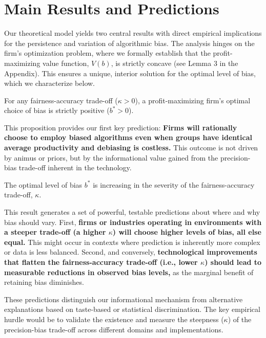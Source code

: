 \section{Main Results and Predictions}

Our theoretical model yields two central results with direct empirical implications for the persistence and variation of algorithmic bias. The analysis hinges on the firm's optimization problem, where we formally establish that the profit-maximizing value function, $V(b)$, is strictly concave (see Lemma 3 in the Appendix). This ensures a unique, interior solution for the optimal level of bias, which we characterize below.

\begin{proposition}
\label{prop:existence}
For any fairness-accuracy trade-off ($\kappa > 0$), a profit-maximizing firm's optimal choice of bias is strictly positive ($b^* > 0$).
\end{proposition}


This proposition provides our first key prediction: \textbf{Firms will rationally choose to employ biased algorithms even when groups have identical average productivity and debiasing is costless.} This outcome is not driven by animus or priors, but by the informational value gained from the precision-bias trade-off inherent in the technology.

\begin{proposition}
\label{prop:comparative_static}
The optimal level of bias $b^*$ is increasing in the severity of the fairness-accuracy trade-off, $\kappa$.
\end{proposition}

This result generates a set of powerful, testable predictions about where and why bias should vary. 
First, \textbf{firms or industries operating in environments with a steeper trade-off (a higher $\kappa$) will choose higher levels of bias, all else equal.} This might occur in contexts where prediction is inherently more complex or data is less balanced.
Second, and conversely, \textbf{technological improvements that flatten the fairness-accuracy trade-off (i.e., lower $\kappa$) should lead to measurable reductions in observed bias levels,} as the marginal benefit of retaining bias diminishes.

These predictions distinguish our informational mechanism from alternative explanations based on taste-based or statistical discrimination. The key empirical hurdle would be to validate the existence and measure the steepness ($\kappa$) of the precision-bias trade-off across different domains and implementations.

